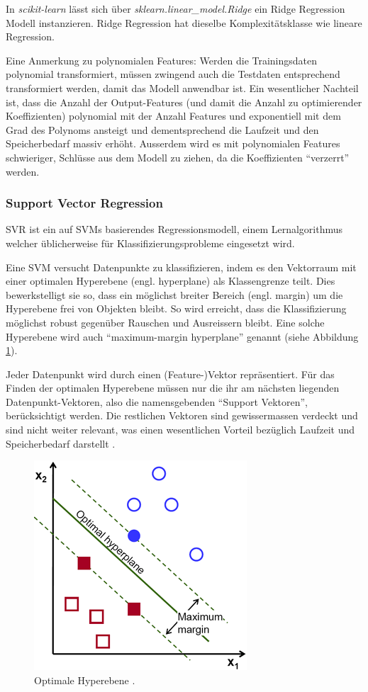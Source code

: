 \documentclass[10pt, a4paper]{article}
\begin{document}
In \emph{scikit-learn} lässt sich über \textit{sklearn.linear\_model.Ridge} ein Ridge Regression Modell instanzieren. Ridge Regression hat dieselbe Komplexitätsklasse wie lineare Regression.

Eine Anmerkung zu polynomialen Features: Werden die Trainingsdaten polynomial transformiert, müssen zwingend auch die Testdaten entsprechend transformiert werden, damit das Modell anwendbar ist. Ein wesentlicher Nachteil ist, dass die Anzahl der Output-Features (und damit die Anzahl zu optimierender Koeffizienten) polynomial mit der Anzahl Features und exponentiell mit dem Grad des Polynoms ansteigt und dementsprechend die Laufzeit und den Speicherbedarf massiv erhöht. Ausserdem wird es mit polynomialen Features schwieriger, Schlüsse aus dem Modell zu ziehen, da die Koeffizienten ``verzerrt'' werden.

\subsubsection{Support Vector Regression}
\ac{SVR} ist ein auf \acp{SVM} basierendes Regressionsmodell, einem Lernalgorithmus welcher üblicherweise für Klassifizierungsprobleme eingesetzt wird.

Eine \ac{SVM} versucht Datenpunkte zu klassifizieren, indem es den Vektorraum mit einer optimalen Hyperebene (engl. hyperplane) als Klassengrenze teilt. Dies bewerkstelligt sie so, dass ein möglichst breiter Bereich (engl. margin) um die Hyperebene frei von Objekten bleibt. So wird erreicht, dass die Klassifizierung möglichst robust gegenüber Rauschen und Ausreissern bleibt. Eine solche Hyperebene wird auch ``maximum-margin hyperplane'' genannt (siehe Abbildung  \ref{fig:svr_optimal_hyperplane}).

Jeder Datenpunkt wird durch einen (Feature-)Vektor repräsentiert. Für das Finden der optimalen Hyperebene müssen nur die ihr am nächsten liegenden Datenpunkt-Vektoren, also die namensgebenden ``Support Vektoren'', be\-rück\-sich\-tigt werden. Die restlichen Vektoren sind gewissermassen verdeckt und sind nicht weiter relevant, was einen wesentlichen Vorteil bezüglich Laufzeit und Speicherbedarf darstellt \cite{svropencv}.

\begin{figure}[h]
	\centering
	\includegraphics[width=0.4\linewidth]{resources/images/svr_optimal_hyperplane}
	\caption{Optimale Hyperebene \cite{svropencv}.}
	\label{fig:svr_optimal_hyperplane}
\end{figure}
\end{document}
